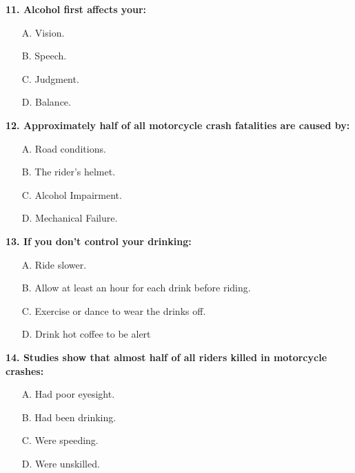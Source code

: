 \begin{minipage}{\linewidth}
\vspace{1em}\noindent\textbf{11. Alcohol first affects your:}

\begin{itemize}[nosep,leftmargin=2em]
\item [A.] Vision.
\item [B.] Speech.
\item [C.] Judgment.
\item [D.] Balance.

\end{itemize}
\end{minipage}


\begin{minipage}{\linewidth}
\vspace{1em}\noindent\textbf{12. Approximately half of all motorcycle crash fatalities are caused by:}

\begin{itemize}[nosep,leftmargin=2em]
\item [A.] Road conditions.
\item [B.] The rider's helmet.
\item [C.] Alcohol Impairment.
\item [D.] Mechanical Failure.

\end{itemize}
\end{minipage}


\begin{minipage}{\linewidth}
\vspace{1em}\noindent\textbf{13. If you don't control your drinking:}

\begin{itemize}[nosep,leftmargin=2em]
\item [A.] Ride slower.
\item [B.] Allow at least an hour for each drink before riding.
\item [C.] Exercise or dance to wear the drinks off.
\item [D.] Drink hot coffee to be alert

\end{itemize}
\end{minipage}


\begin{minipage}{\linewidth}
\vspace{1em}\noindent\textbf{14. Studies show that almost half of all riders killed in motorcycle crashes:}

\begin{itemize}[nosep,leftmargin=2em]
\item [A.] Had poor eyesight.
\item [B.] Had been drinking.
\item [C.] Were speeding.
\item [D.] Were unskilled.

\end{itemize}
\end{minipage}


